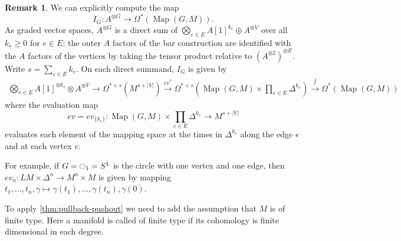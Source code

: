 \documentclass{scrartcl}
\theoremstyle{plain}
\theoremstyle{definition}
\newtheorem{remark}[theorem]{Remark}
\let\xto\xrightarrow
\DeclareMathOperator{\Map}{Map}
\newcommand{\Prod}{\prod}
\begin{document}
\begin{remark}
    We can explicitly compute the map $$I_G\colon A^{\otimes G}\to \Omega^*(\Map(G, M)).$$ As graded vector spaces, $A^{\otimes G}$ is a direct sum of $\bigotimes_{e\in E} A[1]^{k_e}\oplus A^{\otimes V}$ over all $k_e\geq 0$ for $e\in E$: the outer $A$ factors of the bar construction are identified with the $A$ factors of the vertices by taking the tensor product relative to $(A^{\otimes 2})^{\otimes E}$. Write $s=\sum_{e\in E} k_e$. On each direct summand, $I_G$ is given by 
\begin{align*}
    \bigotimes_{e\in E} A[1]^{\otimes k_e} \otimes A^{\otimes V} \to \Omega^{*+s}\left(M^{s+|V|}\right)\xto{ev^*} \Omega^{*+s}\left(\Map(G, M) \times \Prod_{e\in E} \Delta^{k_e}\right) \xto{\int} \Omega^*(\Map(G, M))
\end{align*}
where the evaluation map $$ev=ev_{\{k_e\}}\colon \Map(G, M)\times \Prod_{e\in E} \Delta^{k_e} \to  M^{s+|V|}$$ evaluates each element of the mapping space at the times in $\Delta^{k_e}$ along the edge $e$ and at each vertex $v$. 

For example, if $G=\ocircle_1=S^1$ is the circle with one vertex and one edge, then $ev_n\colon LM\times \Delta^n\to M^n\times M$ is given by mapping $t_1,\dots, t_n, \gamma\mapsto \gamma(t_1),\dots,\gamma(t_n), \gamma(0)$.
\end{remark}

To apply \cref{thm:pullback-pushout} we need to add the assumption that $M$ is of finite type. Here a manifold is called of finite type if its cohomology is finite dimensional in each degree. 
\end{document}
